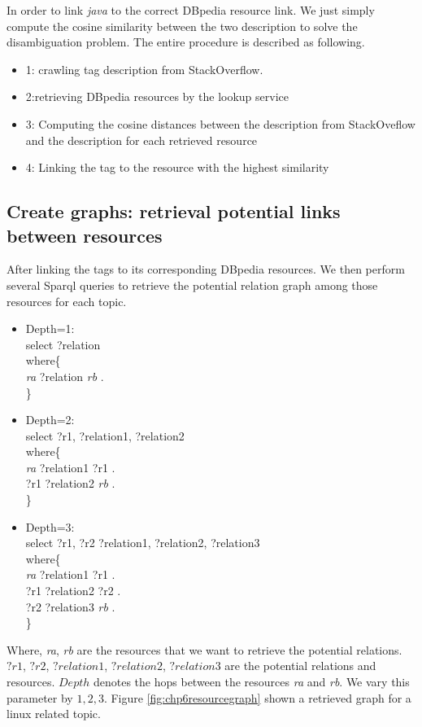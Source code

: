 In order to link \textit{java} to the correct DBpedia resource link. We just simply compute the cosine similarity between the two description to solve the disambiguation problem. The  entire procedure is described as following.

\begin{itemize}
    \item{1: crawling tag description from StackOverflow.}
    \item{2:retrieving DBpedia resources by the lookup service  }
    \item{3: Computing the cosine distances between the description from StackOveflow and the description for each retrieved resource}
    \item{4: Linking the tag to the resource with the highest similarity}
\end{itemize}


\subsection{Create graphs: retrieval potential links between resources}
After linking the tags to its corresponding DBpedia resources. We then perform several Sparql queries to retrieve the potential relation graph among those resources for each topic. 
\begin{itemize}
\item {Depth=1:} \\
select  ?relation \\
where\{ \\
\textit{ra} ?relation \textit{rb} . \\
\} 
\item{ Depth=2:} \\
select  ?r1, ?relation1, ?relation2 \\
where\{ \\
\textit{ra} ?relation1 ?r1 . \\
?r1 ?relation2 \textit{rb} .\\
\} 
\item{ Depth=3:} \\
select  ?r1, ?r2 ?relation1, ?relation2, ?relation3 \\
where\{ \\ 
 \textit{ra} ?relation1 ?r1 . \\
 ?r1 ?relation2 ?r2 .\\
 ?r2 ?relation3 \textit{rb} .\\
\} 
\end{itemize}
Where, \textit{ra}, \textit{rb} are the resources that we want to retrieve the potential relations. $?r1$, $?r2$, $?relation1$, $?relation2$, $?relation3$ are the potential relations and resources. $Depth$ denotes the hops between the resources \textit{ra} and \textit{rb}. We vary this parameter by $1,2,3$. Figure \ref{fig:chp6resourcegraph} shown a retrieved graph for a linux related topic.


